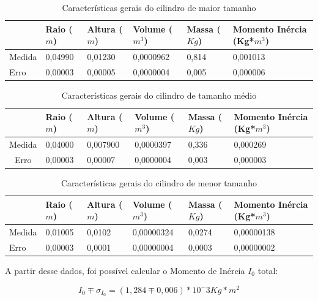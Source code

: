 \documentclass[a4paper]{article}
\begin{document}
\begin{table}[!htbp]
\centering
    \caption{Características gerais do cilindro de maior tamanho}
    \begin{tabular}{|l|l|l|l|l|l|}
    \hline
    ~      & Raio ($m$) & Altura ($m$) & Volume ($m^3$) & Massa ($Kg$) & Momento Inércia (Kg*$m^3$) \\ \hline
    Medida & 0,04990	&	0,01230	&	0,0000962	&	0,814	&	0,001013 \\ \hline
    Erro   & 0,00003	&	0,00005	&	0,0000004	&	0,005	&	0,000006 \\ \hline
    \end{tabular}
    \label{tab:CilindroMaior}
\end{table}

\begin{table}[!htbp]
\centering
    \caption{Características gerais do cilindro de tamanho médio}
    \begin{tabular}{|c|l|l|l|l|l|}
    \hline
    ~      & Raio ($m$) & Altura ($m$) & Volume ($m^3$) & Massa ($Kg$) & Momento Inércia (Kg*$m^3$) \\ \hline
    Medida & 0,04000  & 0,007900	&	0,0000397	&	0,336	&	0,000269                \\ \hline
    Erro   & 0,00003	&	0,00007	&	0,0000004	&	0,003	&	0,000003               \\ \hline
    \end{tabular}
    \label{tab:CilindroMeio}
\end{table}

\begin{table}[!htbp]
\centering
    \caption{Características gerais do cilindro de menor tamanho}
    \begin{tabular}{|l|l|l|l|l|l|}
    \hline
    ~      & Raio ($m$) & Altura ($m$) & Volume ($m^3$) & Massa ($Kg$) & Momento Inércia (Kg*$m^3$) \\ \hline
    Medida & 0,01005  & 0,0102     & 0,00000324  & 0,0274     & 0,00000138                \\ \hline
    Erro   & 0,00003  & 0,0001     & 0,00000004  & 0,0003     & 0,00000002                \\ \hline
    \end{tabular}
    \label{tab:CilindroMenor}
\end{table}

A partir desse dados, foi possível calcular o Momento de Inércia $I_0$ total:

$$I_0 \mp \sigma_{I_0} = (1,284\mp0,006)*10^-3 Kg*m^2$$
\end{document}
